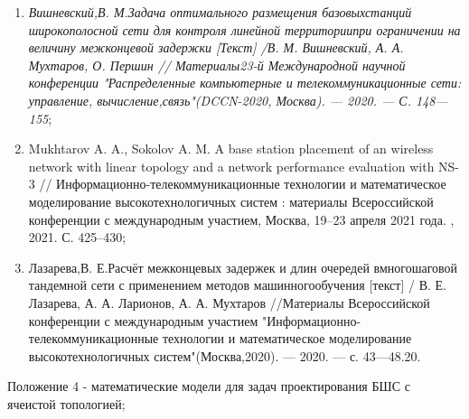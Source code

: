 \begin{frame}
\begin{minipage}[c]{1\linewidth}
\begin{enumerate}
            \item \textit{{Вишневский,В. М.Задача оптимального размещения базовыхстанций широкополосной сети для контроля линейной территориипри ограничении на величину межконцевой задержки [Текст] /В. М. Вишневский, А. А. Мухтаров, О. Першин // Материалы23-й Международной научной конференции "Распределенные ком­пьютерные и телекоммуникационные сети: управление, вычисление,связь"(DCCN-2020, Москва). — 2020. — С. 148—155}};
            \item Mukhtarov A. A., Sokolov A. M. A base station placement of an wireless network with linear topology and a network performance evaluation with NS-3 // Информационно-телекоммуникационные технологии и математическое моделирование высокотехнологичных систем : материалы Всероссийской конференции с международным участием, Москва, 19–23 апреля 2021 года. , 2021. С. 425–430;
            \item Лазарева,В. Е.Расчёт межконцевых задержек и длин очередей вмногошаговой тандемной сети с применением методов машинногообучения [текст] / В. Е. Лазарева, А. А. Ларионов, А. А. Мухтаров //Материалы Всероссийской конференции с международным уча­стием "Информационно-телекоммуникационные технологии и мате­матическое моделирование высокотехнологичных систем"(Москва,2020). — 2020. — с. 43—48.20.
        \end{enumerate}
    \end{minipage}

\end{frame}

\begin{frame}
    \begin{center}
        {Положение 4 - математические модели для задач проектирования БШС с ячеистой
        топологией;}
    \end{center}
\end{frame}



